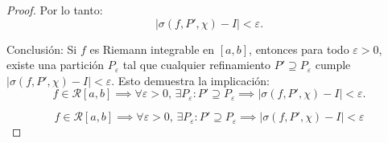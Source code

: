 \documentclass{article}
\begin{document}
\begin{proof}
	Por lo tanto:  
	\[
	|\sigma(f, P', \chi) - I| < \varepsilon.
	\]
	
	Conclusión:
	Si \( f \) es Riemann integrable en \([a, b]\), entonces para todo \( \varepsilon > 0 \), existe una partición \( P_\varepsilon \) tal que cualquier refinamiento \( P' \supseteq P_\varepsilon \) cumple \( |\sigma(f, P', \chi) - I| < \varepsilon \). Esto demuestra la implicación:  
	\[
	f \in \mathcal{R}[a, b] \implies \forall \varepsilon > 0,\, \exists P_\varepsilon : P' \supseteq P_\varepsilon \implies |\sigma(f, P', \chi) - I| < \varepsilon.
	\]
	
	\[
	\boxed{
		f \in \mathcal{R}[a, b] \implies \forall \varepsilon > 0,\, \exists P_\varepsilon : P' \supseteq P_\varepsilon \implies |\sigma(f, P', \chi) - I| < \varepsilon
	}
	\]
		
	\end{proof}
	
\end{document}
